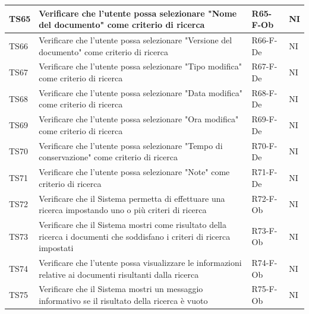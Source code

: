 \documentclass[a4paper,12pt]{article}
\begin{document}
\begin{longtable}{|M{1.2cm}|M{6.3cm}|M{2.5cm}|M{1.5cm}|}
                TS65 & Verificare che l'utente possa selezionare "Nome del documento" come criterio di ricerca & R65-F-Ob & NI \\
                \hline

                TS66 & Verificare che l'utente possa selezionare "Versione del documento" come criterio di ricerca & R66-F-De & NI \\
                \hline

                TS67 & Verificare che l'utente possa selezionare "Tipo modifica" come criterio di ricerca & R67-F-De & NI \\
                \hline

                TS68 & Verificare che l'utente possa selezionare "Data modifica" come criterio di ricerca & R68-F-De & NI \\
                \hline

                TS69 & Verificare che l'utente possa selezionare "Ora modifica" come criterio di ricerca & R69-F-De & NI \\
                \hline

                TS70 & Verificare che l'utente possa selezionare "Tempo di conservazione" come criterio di ricerca & R70-F-De & NI \\
                \hline

                TS71 & Verificare che l'utente possa selezionare "Note" come criterio di ricerca & R71-F-De & NI \\
                \hline

                TS72 & Verificare che il Sistema permetta di effettuare una ricerca impostando uno o più criteri di ricerca & R72-F-Ob & NI \\
                \hline

                TS73 & Verificare che il Sistema mostri come risultato della ricerca i documenti che soddisfano i criteri di ricerca impostati & R73-F-Ob & NI \\
                \hline

                TS74 & Verificare che l'utente possa visualizzare le informazioni relative ai documenti risultanti dalla ricerca & R74-F-Ob & NI \\
                \hline

                TS75 & Verificare che il Sistema mostri un messaggio informativo se il risultato della ricerca è vuoto & R75-F-Ob & NI \\
                \hline


\end{longtable}
\end{document}
